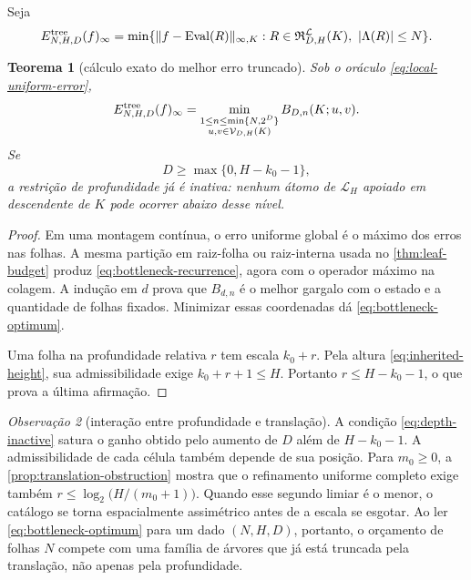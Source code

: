 \documentclass[11pt,a4paper]{article}
\newtheorem{theorem}{Teorema}[section]
\theoremstyle{definition}
\theoremstyle{remark}
\newtheorem{remark}[theorem]{Observação}
\newcommand{\Library}{\mathcal{L}}
\newcommand{\Representations}{\mathfrak{R}}
\newcommand{\Values}{\mathcal{V}}
\newcommand{\Eval}{\operatorname{Eval}}
\begin{document}
Seja
\begin{equation}
 E_{N,H,D}^{\rm tree}(f)_\infty
 =\min\{\|f-\Eval(R)\|_{\infty,K}:
 R\in\Representations_{D,H}^{\Library}(K),\
 |\Lambda(R)|\le N\}.
 \label{eq:truncated-tree-error}
\end{equation}

\begin{theorem}[cálculo exato do melhor erro truncado]
\label{thm:bottleneck}
Sob o oráculo \eqref{eq:local-uniform-error},
\begin{equation}
 E_{N,H,D}^{\rm tree}(f)_\infty
 =\min_{\substack{1\le n\le\min\{N,2^D\}\\
                  u,v\in\Values_{D,H}(K)}}
 B_{D,n}(K;u,v).
 \label{eq:bottleneck-optimum}
\end{equation}
Se
\begin{equation}
 D\ge \max\{0,H-k_0-1\},
 \label{eq:depth-inactive}
\end{equation}
a restrição de profundidade já é inativa: nenhum átomo de $\Library_H$
apoiado em descendente de $K$ pode ocorrer abaixo desse nível.
\end{theorem}

\begin{proof}
Em uma montagem contínua, o erro uniforme global é o máximo dos erros nas
folhas. A mesma partição em raiz-folha ou raiz-interna usada no
\cref{thm:leaf-budget} produz
\eqref{eq:bottleneck-recurrence}, agora com o operador máximo na colagem.
A indução em $d$ prova que $B_{d,n}$ é o melhor gargalo com o estado e a
quantidade de folhas fixados. Minimizar essas coordenadas dá
\eqref{eq:bottleneck-optimum}.

Uma folha na profundidade relativa $r$ tem escala $k_0+r$. Pela altura
\eqref{eq:inherited-height}, sua admissibilidade exige
$k_0+r+1\le H$. Portanto $r\le H-k_0-1$, o que prova a última afirmação.
\end{proof}

\begin{remark}[interação entre profundidade e translação]
\label{rem:depth-vs-translation}
A condição \eqref{eq:depth-inactive} satura o ganho obtido pelo aumento de $D$
além de $H-k_0-1$. A admissibilidade de cada célula também depende de sua
posição.
Para $m_0\ge0$, a \cref{prop:translation-obstruction} mostra que o refinamento
uniforme completo exige também
$r\le\log_2\bigl(H/(m_0+1)\bigr)$. Quando esse segundo limiar é o menor, o
catálogo se torna espacialmente assimétrico antes de a escala se esgotar. Ao ler
\eqref{eq:bottleneck-optimum} para um dado $(N,H,D)$, portanto, o orçamento de
folhas $N$ compete com uma família de árvores que já está truncada pela
translação, não apenas pela profundidade.
\end{remark}
\end{document}
